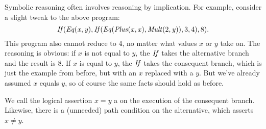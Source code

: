 Symbolic reasoning often involves reasoning by implication.  For
example, consider a slight tweak to the above program:
\[
\mathit{If}(\mathit{Eq}(\mathit{x},\mathit{y}),
 \mathit{If}(\mathit{Eq}(\mathit{Plus}(\mathit{x},\mathit{x}), \mathit{Mult}(2,\mathit{y})), 3, 4),
  8)\text.
\]
This program also cannot reduce to 4, no matter what values
\(\mathit{x}\) or \(\mathit{y}\) take on.  The reasoning is obvious:
if \(\mathit{x}\) is not equal to \(\mathit{y}\), the \(\mathit{If}\) takes the
alternative branch and the result is 8.  If \(\mathit{x}\) is equal to
\(\mathit{y}\), the \(\mathit{If}\) takes the consequent branch, which is just the
example from before, but with an \(\mathit{x}\) replaced with a
\(\mathit{y}\).  But we've already assumed \(\mathit{x}\) equals
\(\mathit{y}\), so of course the same facts should hold as before.

We call the logical assertion \(\mathit{x} = \mathit{y}\) a
 on the execution of the consequent branch.
Likewise, there is a (unneeded) path condition on the alternative,
which asserts \(\mathit{x} \neq \mathit{y}\).



     








